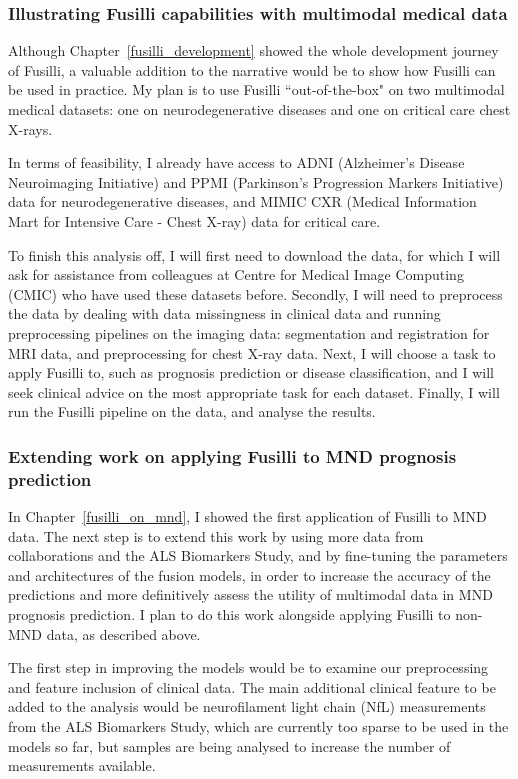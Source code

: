 \subsubsection*{Illustrating Fusilli capabilities with multimodal medical data}

Although Chapter~\ref{fusilli_development} showed the whole development journey of Fusilli, a valuable addition to the narrative would be to show how Fusilli can be used in practice.
My plan is to use Fusilli ``out-of-the-box" on two multimodal medical datasets: one on neurodegenerative diseases and one on critical care chest X-rays.

In terms of feasibility, I already have access to ADNI (Alzheimer's Disease Neuroimaging Initiative) and PPMI (Parkinson's Progression Markers Initiative) data for neurodegenerative diseases, and MIMIC CXR (Medical Information Mart for Intensive Care - Chest X-ray) data for critical care.

To finish this analysis off, I will first need to download the data, for which I will ask for assistance from colleagues at Centre for Medical Image Computing (CMIC) who have used these datasets before.
Secondly, I will need to preprocess the data by dealing with data missingness in clinical data and running preprocessing pipelines on the imaging data: segmentation and registration for MRI data, and preprocessing for chest X-ray data.
Next, I will choose a task to apply Fusilli to, such as prognosis prediction or disease classification, and I will seek clinical advice on the most appropriate task for each dataset.
Finally, I will run the Fusilli pipeline on the data, and analyse the results.

\subsubsection*{Extending work on applying Fusilli to MND prognosis prediction}

In Chapter~\ref{fusilli_on_mnd}, I showed the first application of Fusilli to MND data.
The next step is to extend this work by using more data from collaborations and the ALS Biomarkers Study, and by fine-tuning the parameters and architectures of the fusion models, in order to increase the accuracy of the predictions and more definitively assess the utility of multimodal data in MND prognosis prediction.
I plan to do this work alongside applying Fusilli to non-MND data, as described above.

The first step in improving the models would be to examine our preprocessing and feature inclusion of clinical data.
The main additional clinical feature to be added to the analysis would be neurofilament light chain (NfL) measurements from the ALS Biomarkers Study, which are currently too sparse to be used in the models so far, but samples are being analysed to increase the number of measurements available.

